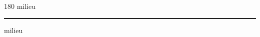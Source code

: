 
\begin{frame}
\begin{center}
\begin{turn}{180}
{\fontsize{2.5cm}{1em}\selectfont milieu}
\end{turn}
\vspace{1em}\par  
\hrule
\vspace{1em}\par  
{\fontsize{2.5cm}{1em}\selectfont milieu}
\end{center}
\end{frame}
